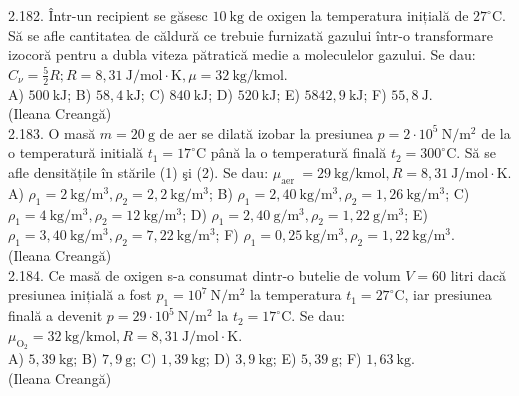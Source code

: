 2.182. Într-un recipient se găsesc $10 \mathrm{~kg}$ de oxigen la temperatura inițială de $27^{\circ} \mathrm{C}$. Să se afle cantitatea de căldură ce trebuie furnizată gazului într-o transformare izocoră pentru a dubla viteza pătratică medie a moleculelor gazului. Se dau: $C_{\nu}=\frac{5}{2} R ; R=8,31 \mathrm{~J} / \mathrm{mol} \cdot \mathrm{K}, \mu=32 \mathrm{~kg} / \mathrm{kmol}$.\\ A) $500 \mathrm{~kJ}$; B) $58,4 \mathrm{~kJ}$; C) $840 \mathrm{~kJ}$; D) $520 \mathrm{~kJ}$; E) $5842,9 \mathrm{~kJ}$; F) $55,8 \mathrm{~J}$.\\ (Ileana Creangă)\\

2.183. O masă $m=20 \mathrm{~g}$ de aer se dilată izobar la presiunea $p=2 \cdot 10^{5} \mathrm{~N} / \mathrm{m}^{2}$ de la o temperatură initială $t_{1}=17^{\circ} \mathrm{C}$ până la o temperatură finală $t_{2}=300^{\circ} \mathrm{C}$. Să se afle densitățile în stările (1) şi (2). Se dau: $\mu_{\text {aer }}=29 \mathrm{~kg} / \mathrm{kmol}, R=8,31 \mathrm{~J} / \mathrm{mol} \cdot \mathrm{K}$.\\ A) $\rho_{1}=2 \mathrm{~kg} / \mathrm{m}^{3}, \rho_{2}=2,2 \mathrm{~kg} / \mathrm{m}^{3}$; B) $\rho_{1}=2,40 \mathrm{~kg} / \mathrm{m}^{3}, \rho_{2}=1,26 \mathrm{~kg} / \mathrm{m}^{3}$; C) $\rho_{1}=4 \mathrm{~kg} / \mathrm{m}^{3}, \rho_{2}=12 \mathrm{~kg} / \mathrm{m}^{3}$; D) $\rho_{1}=2,40 \mathrm{~g} / \mathrm{m}^{3}, \rho_{2}=1,22 \mathrm{~g} / \mathrm{m}^{3}$; E) $\rho_{1}=3,40 \mathrm{~kg} / \mathrm{m}^{3}, \rho_{2}=7,22 \mathrm{~kg} / \mathrm{m}^{3}$; F) $\rho_{1}=0,25 \mathrm{~kg} / \mathrm{m}^{3}, \rho_{2}=1,22 \mathrm{~kg} / \mathrm{m}^{3}$.\\ (Ileana Creangă)\\

2.184. Ce masă de oxigen s-a consumat dintr-o butelie de volum $V=60$ litri dacă presiunea inițială a fost $p_{1}=10^{7} \mathrm{~N} / \mathrm{m}^{2}$ la temperatura $t_{1}=27^{\circ} \mathrm{C}$, iar presiunea finală a devenit $p=29 \cdot 10^{5} \mathrm{~N} / \mathrm{m}^{2}$ la $t_{2}=17^{\circ} \mathrm{C}$. Se dau: $\mu_{\mathrm{O}_{2}}=32 \mathrm{~kg} / \mathrm{kmol}, R=8,31 \mathrm{~J} / \mathrm{mol} \cdot \mathrm{K}$.\\ A) $5,39 \mathrm{~kg}$; B) $7,9 \mathrm{~g}$; C) $1,39 \mathrm{~kg}$; D) $3,9 \mathrm{~kg}$; E) $5,39 \mathrm{~g}$; F) $1,63 \mathrm{~kg}$.\\ (Ileana Creangă)\\

